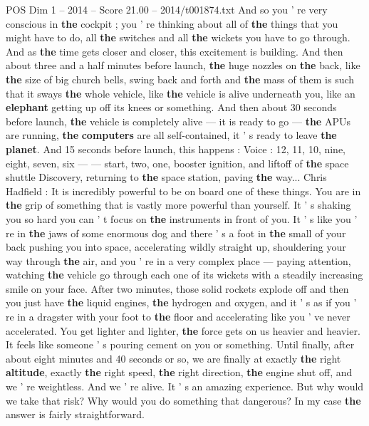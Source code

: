 \begin{textsample}{POS Dim 1 – 2014 – Score 21.00 – 2014/t001874.txt}
And so you ' re very conscious in \textbf{the} cockpit ; you ' re thinking about all of \textbf{the} things that you might have to do, all \textbf{the} switches and all \textbf{the} wickets you have to go through.
And as \textbf{the} time gets closer and closer, this excitement is building.
And then about three and a half minutes before launch, \textbf{the} huge nozzles on \textbf{the} back, like \textbf{the} size of big church bells, swing back and forth and \textbf{the} mass of them is such that it sways \textbf{the} whole vehicle, like \textbf{the} vehicle is alive underneath you, like an \textbf{elephant} getting up off its knees or something.
And then about 30 seconds before launch, \textbf{the} vehicle is completely alive — it is ready to go — \textbf{the} APUs are running, \textbf{the} \textbf{computers} are all self-contained, it ' s ready to leave \textbf{the} \textbf{planet}.
And 15 seconds before launch, this happens : Voice : 12, 11, 10, nine, eight, seven, six — — start, two, one, booster ignition, and liftoff of \textbf{the} space shuttle Discovery, returning to \textbf{the} space station, paving \textbf{the} way...
Chris Hadfield : It is incredibly powerful to be on board one of these things.
You are in \textbf{the} grip of something that is vastly more powerful than yourself.
It ' s shaking you so hard you can ' t focus on \textbf{the} instruments in front of you.
It ' s like you ' re in \textbf{the} jaws of some enormous dog and there ' s a foot in \textbf{the} small of your back pushing you into space, accelerating wildly straight up, shouldering your way through \textbf{the} air, and you ' re in a very complex place — paying attention, watching \textbf{the} vehicle go through each one of its wickets with a steadily increasing smile on your face.
After two minutes, those solid rockets explode off and then you just have \textbf{the} liquid engines, \textbf{the} hydrogen and oxygen, and it ' s as if you ' re in a dragster with your foot to \textbf{the} floor and accelerating like you ' ve never accelerated.
You get lighter and lighter, \textbf{the} force gets on us heavier and heavier.
It feels like someone ' s pouring cement on you or something.
Until finally, after about eight minutes and 40 seconds or so, we are finally at exactly \textbf{the} right \textbf{altitude}, exactly \textbf{the} right speed, \textbf{the} right direction, \textbf{the} engine shut off, and we ' re weightless.
And we ' re alive.
It ' s an amazing experience.
But why would we take that risk?
Why would you do something that dangerous?
In my case \textbf{the} answer is fairly straightforward.

\end{textsample}
